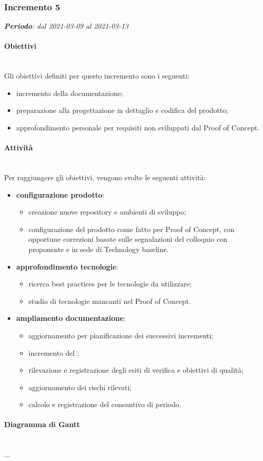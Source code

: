 \subsubsection{Incremento 5}
\textit{\textbf{Periodo}: dal 2021-03-09 al 2021-03-13}

\paragraph{Obiettivi}\\
Gli obiettivi definiti per questo incremento sono i seguenti:
\begin{itemize}
\item incremento della documentazione;
\item preparazione alla progettazione in dettaglio e codifica del prodotto;
\item approfondimento personale per requisiti non sviluppati dal Proof of Concept.
\end{itemize}

\paragraph{Attività}\\
Per raggiungere gli obiettivi, vengono svolte le seguenti attività:
\begin{itemize}

\item \textbf{configurazione prodotto}:
\begin{itemize}
\item creazione nuove repository e ambienti di sviluppo;
\item configurazione del prodotto come fatto per Proof of Concept, con opportune correzioni basate sulle segnalazioni del colloquio con proponente e in sede di Technology baseline.
\end{itemize}

\item \textbf{approfondimento tecnologie}:
\begin{itemize}
\item ricerca best practices per le tecnologie da utilizzare;
\item studio di tecnologie mancanti nel Proof of Concept.
\end{itemize}

\item \textbf{ampliamento documentazione}:
\begin{itemize}
\item aggiornamento  per pianificazione dei successivi incrementi;
\item incremento del ;
\item rilevazione e registrazione degli esiti di verifica e obiettivi di qualità;
\item aggiornamento dei rischi rilevati;
\item calcolo e registrazione del consuntivo di periodo.
\end{itemize}

\end{itemize}
\paragraph{Diagramma di Gantt}\\
...

